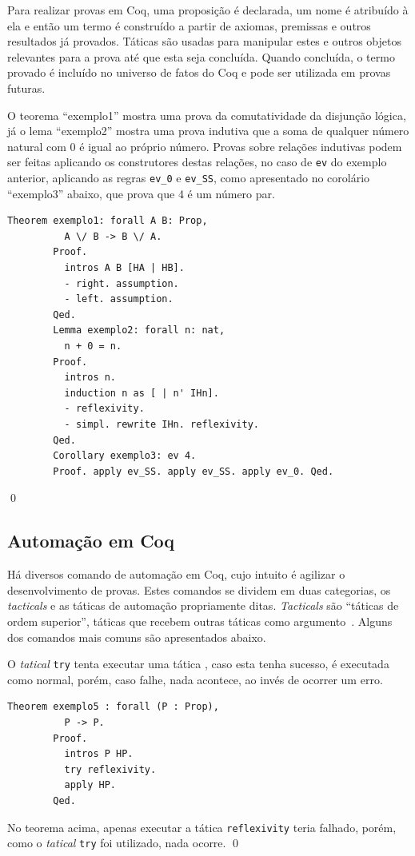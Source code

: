 		Para realizar provas em Coq, uma proposição é declarada, um nome é atribuído à ela e então um termo é construído a partir de axiomas,
		premissas e outros resultados já provados. Táticas são usadas para manipular estes e outros objetos relevantes para a prova até que esta seja concluída.
		Quando concluída, o termo provado é incluído no universo de fatos do Coq e pode ser utilizada em provas futuras.

		\begin{exemplo}
			O teorema ``exemplo1'' mostra uma prova da comutatividade da disjunção lógica, já o lema ``exemplo2'' mostra uma prova indutiva que a soma de
			qualquer número natural com 0 é igual ao próprio número. Provas sobre relações indutivas podem ser feitas
			aplicando os construtores destas relações, no caso de \texttt{ev} do exemplo anterior, aplicando as regras \texttt{ev\_0} e \texttt{ev\_SS},
			como apresentado no corolário ``exemplo3'' abaixo, que prova que 4 é um número par.
			\begin{lstlisting}[language=coq]
		Theorem exemplo1: forall A B: Prop,
		  A \/ B -> B \/ A.
		Proof.
		  intros A B [HA | HB].
		  - right. assumption.
		  - left. assumption.
		Qed.
		Lemma exemplo2: forall n: nat,
		  n + 0 = n.
		Proof.
		  intros n.
		  induction n as [ | n' IHn].
		  - reflexivity.
		  - simpl. rewrite IHn. reflexivity.
		Qed.
		Corollary exemplo3: ev 4.
		Proof. apply ev_SS. apply ev_SS. apply ev_0. Qed.
			\end{lstlisting}
			\qed
		\end{exemplo}

		\subsection{Automação em Coq}
			\label{subsec:AutoCoq}
			Há diversos comando de automação em Coq, cujo intuito é agilizar o desenvolvimento de provas. Estes comandos se dividem em duas categorias,
			os \textit{tacticals} e as táticas de automação propriamente ditas. \textit{Tacticals} são ``táticas de ordem superior'', táticas que recebem
			outras táticas como argumento~\cite{pierce2021software}. Alguns dos comandos mais comuns são apresentados abaixo.

			\begin{exemplo}
				O \textit{tatical} \texttt{try} tenta executar uma tática , caso esta tenha sucesso,  é executada como normal, porém, caso
				 falhe, nada acontece, ao invés de ocorrer um erro.
				\begin{lstlisting}[language=coq]
		Theorem exemplo5 : forall (P : Prop),
		  P -> P.
		Proof.
		  intros P HP.
		  try reflexivity.
		  apply HP.
		Qed.
				\end{lstlisting}
				No teorema acima, apenas executar a tática \texttt{reflexivity} teria falhado, porém, como o \textit{tatical} \texttt{try} foi utilizado, nada ocorre. \qed
			\end{exemplo}

